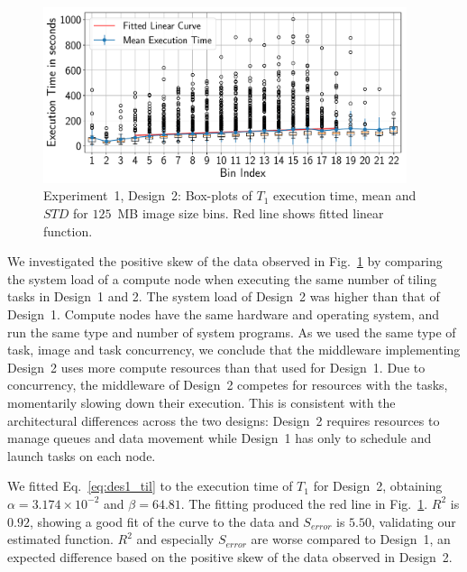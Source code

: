 \begin{figure}[ht!]
    \centering
    \includegraphics[width=0.95\textwidth]{figures/designs/stage_0_tx_box_des2.pdf}
    \caption{Experiment~1, Design~2: Box-plots of $T_{1}$ execution time, mean and $STD$ for $125$~MB image size bins.
        Red line shows fitted linear function.}\label{fig:stage_1_execution_des2}
\end{figure}


We investigated the positive skew of the data observed in Fig.~\ref{fig:stage_1_execution_des2} by comparing the system load of a compute node when executing the same number of tiling tasks in Design~1 and 2.
The system load of Design~2 was higher than that of Design~1.
Compute nodes have the same hardware and operating system, and run the same type and number of system programs.
As we used the same type of task, image and task concurrency, we conclude that the middleware implementing Design~2 uses more compute resources than that used for Design~1.
Due to concurrency, the middleware of Design~2 competes for resources with the tasks, momentarily slowing down their execution.
This is consistent with the architectural differences across the two designs: Design~2 requires resources to manage queues and data movement while Design~1 has only to schedule and launch tasks on each node.

We fitted Eq.~\ref{eq:des1_til} to the execution time of $T_1$ for Design~2, obtaining $\alpha = 3.174 \times 10^{-2}$ and $\beta = 64.81$.
The fitting produced the red line in Fig.~\ref{fig:stage_1_execution_des2}.
$R^{2}$ is $0.92$, showing a good fit of the curve to the data and $S_{error}$ is $5.50$, validating our estimated function.
$R^2$ and especially $S_{error}$ are worse compared to Design~1, an expected difference based on the positive skew of the data observed in Design~2.


